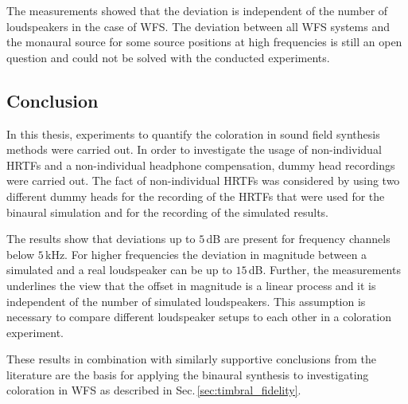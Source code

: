 The measurements showed that the deviation is independent of the number of
loudspeakers in the case of \ac{WFS}. The deviation between all \ac{WFS}
systems and the monaural source for some source positions at high frequencies
is still an open question and could not be solved with the conducted
experiments.

\subsection{Conclusion}
%
In this thesis, experiments to quantify the coloration in sound field synthesis
methods were carried out. In order to investigate the usage of
non-individual \acp{HRTF} and a non-individual headphone compensation, dummy head
recordings were carried out. The fact of non-individual \acp{HRTF} was considered
by using two different dummy heads for the recording of the \acp{HRTF} that were used
for the binaural simulation and for the recording of the simulated results.

The results show that deviations up to $5$\,dB are present for frequency
channels below $5$\,kHz. For higher frequencies the deviation in magnitude
between a simulated and a real loudspeaker can be up to $15$\,dB.
Further, the measurements underlines the view that the offset in magnitude is a
linear process and it is independent of the number of simulated loudspeakers.
This assumption is necessary to compare different loudspeaker setups to each
other in a coloration experiment.

These results in combination with similarly supportive conclusions
from the literature are the
basis for applying the binaural synthesis to investigating coloration in
\ac{WFS} as described in Sec.\,\ref{sec:timbral_fidelity}.
